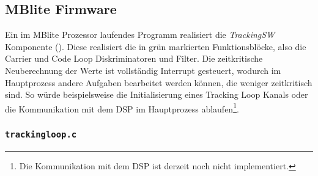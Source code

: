 




\subsection{MBlite Firmware}
\label{MBliteFirmware}
Ein im MBlite Prozessor laufendes Programm realisiert die \emph{TrackingSW} Komponente (). Diese realisiert die in  grün markierten Funktionsblöcke, also die Carrier und Code Loop Diskriminatoren und Filter. Die zeitkritische Neuberechnung der Werte ist vollständig Interrupt gesteuert, wodurch im Hauptprozess andere Aufgaben bearbeitet werden können, die weniger zeitkritisch sind. So würde beispielsweise die Initialisierung eines Tracking Loop Kanals oder die Kommunikation mit dem DSP im Hauptprozess ablaufen\footnote{Die Kommunikation mit dem DSP ist derzeit noch nicht implementiert.}.




\subsubsection{\lstinline$trackingloop.c$}

